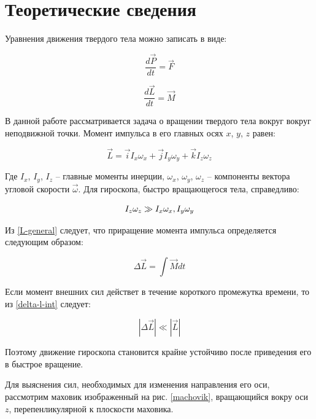\documentclass[a4paper,12pt]{article}
\begin{document}
\section{Теоретические сведения}

Уравнения движения твердого тела можно записать в виде:

\begin{equation}
    \frac{d \vec{P}}{dt} = \vec{F}
\end{equation}

\begin{equation}\label{L-general}
    \frac{d \vec{L}}{dt} = \vec{M}
\end{equation}

В данной работе рассматривается задача о вращении твердого тела вокруг вокруг неподвижной точки. Момент импульса в его главных осях $x$, $y$, $z$ равен:

\begin{equation}
    \vec{L} = \vec{i} I_{x} \omega_{x} + \vec{j} I_{y} \omega_{y} + \vec{k} I_{z} \omega_{z}
\end{equation}

Где $I_{x}$, $I_{y}$, $I_{z}$ -- главные моменты инерции, $\omega_{x}$, $\omega_{y}$, $\omega_{z}$ -- компоненты вектора угловой скорости $\vec{\omega}$. Для гироскопа, быстро вращающегося тела, справедливо:

\begin{equation}
    I_{z} \omega_{z} \gg I_{x} \omega_{x}, \space I_{y} \omega_{y}
\end{equation}

Из \eqref{L-general} следует, что приращение момента импульса определяется следующим образом:

\begin{equation}\label{delta-l-int}
    \Delta \vec{L} = \int \vec{M} dt
\end{equation}

Если момент внешних сил действет в течение короткого промежутка времени, то из \eqref{delta-l-int} следует:

\begin{equation}
    \left | \Delta \vec{L} \right | \ll \left | \vec{L} \right |
\end{equation}

Поэтому движение гироскопа становится крайне устойчиво после приведения его в быстрое вращение.

Для выяснения сил, необходимых для изменения направления его оси, рассмотрим маховик изображенный на рис. \ref{machovik}, вращающийся вокру оси $z$, перепенликулярной к плоскости маховика.
\end{document}
